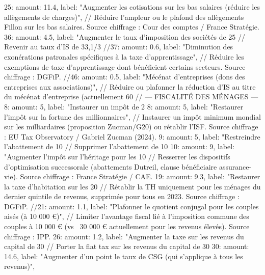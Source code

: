 {{{{{{{{{{{{{{		25: { amount: 11.4, label: "Augmenter les cotisations sur les bas salaires (réduire les allègements de charges)"},
			  // Réduire l'ampleur ou le plafond des allègements Fillon sur les bas salaires. Source chiffrage : Cour des comptes / France Stratégie.
		36: { amount: 4.5,  label: "Augmenter le taux d'imposition des sociétés de 25%
			  // Revenir au taux d'IS de 33,1/3 %
		//37: { amount: 0.6,  label: "Diminution des exonérations patronales spécifiques à la taxe d'apprentissage"},
			  // Réduire les exemptions de taxe d'apprentissage dont bénéficient certains secteurs. Source chiffrage : DGFiP.
		//46: { amount: 0.5,  label: "Mécénat d'entreprises (dons des entreprises aux associations)"},
			  // Réduire ou plafonner la réduction d'IS au titre du mécénat d'entreprise (actuellement 60 %
		// --- FISCALITÉ DES MÉNAGES ---
		8:  { amount: 5,    label: "Instaurer un impôt de 2%
		8:  { amount: 5,    label: "Restaurer l'impôt sur la fortune des millionnaires"},
			  // Instaurer un impôt minimum mondial sur les milliardaires (proposition Zucman/G20) ou rétablir l'ISF. Source chiffrage : EU Tax Observatory / Gabriel Zucman (2024).
		9:  { amount: 5,    label: "Restreindre l'abattement de 10%
			  // Supprimer l'abattement de 10 %
		10: { amount: 9,    label: "Augmenter l'impôt sur l'héritage pour les 10%
			  // Resserrer les dispositifs d'optimisation successorale (abattements Dutreil, clause bénéficiaire assurance-vie). Source chiffrage : France Stratégie / CAE.
		19: { amount: 9.3,  label: "Restaurer la taxe d'habitation sur les 20 %
			  // Rétablir la TH uniquement pour les ménages du dernier quintile de revenus, supprimée pour tous en 2023. Source chiffrage : DGFiP.
		//21: { amount: 1.1,  label: "Plafonner le quotient conjugal pour les couples aisés (à 10 000 €)"},
			  // Limiter l'avantage fiscal lié à l'imposition commune des couples à 10 000 € (vs ~30 000 € actuellement pour les revenus élevés). Source chiffrage : IPP.
		26: { amount: 1.2,  label: "Augmenter la taxe sur les revenus du capital de 30%
			  // Porter la flat tax sur les revenus du capital de 30 %
		30: { amount: 14.6, label: "Augmenter d'un point le taux de CSG (qui s'applique à tous les revenus)"},
}}}}}}}}}}}}}}}}}}}}
